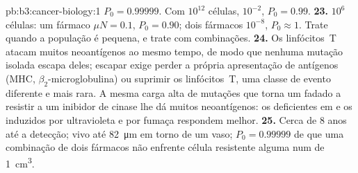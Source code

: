 \begin{solution}{pb:b3:cancer-biology:1}
$P_{0} = 0.99999$. Com $10^{12}$ células, $10^{-2}$, $P_{0} = 0.99$.
\textbf{23.} $10^{6}$ células: um fármaco $\mu N = 0.1$, $P_{0} = 0.90$;
dois fármacos $10^{-8}$, $P_{0} \approx 1$. Trate quando a população é
pequena, e trate com combinações.
\textbf{24.} Os linfócitos~T atacam muitos neoantígenos ao mesmo tempo,
de modo que nenhuma mutação isolada escapa deles; escapar exige perder a
própria apresentação de antígenos (MHC,
$\beta_{2}$-microglobulina) ou suprimir os linfócitos~T, uma classe de
evento diferente e mais rara. A mesma carga alta de mutações que torna
um  fadado a resistir a um inibidor de cinase lhe dá muitos
neoantígenos: os  deficientes em  e os
induzidos por ultravioleta e por fumaça respondem melhor.
\textbf{25.} Cerca de $8$ anos até a detecção;  vivo até
\qty{82}{\micro m} em torno de um vaso; $P_{0} = 0.99999$ de que uma
combinação de dois fármacos não enfrente célula resistente alguma num
 de \qty{1}{cm^3}.
\end{solution}
